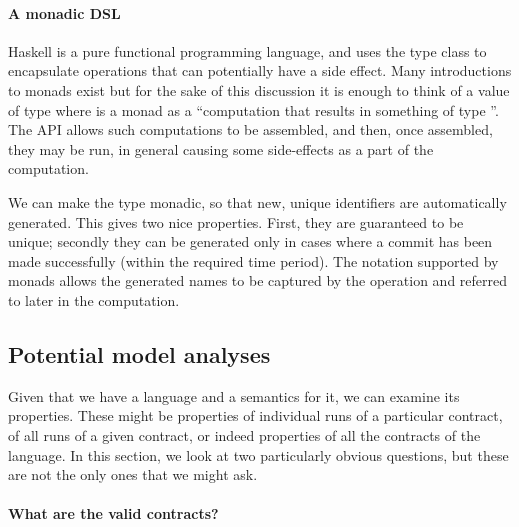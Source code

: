 \documentclass[runningheads]{llncs}
\begin{document}
\paragraph{A monadic DSL}

Haskell is a pure functional programming language, and uses the  type class to encapsulate
operations that can potentially have a side effect. Many introductions to monads exist \cite{wadler1990comprehending} 
but for the sake of this discussion it is enough to think of a value of type  where  
is a monad as a ``computation that results in something of type ''. The  API 
allows such computations to be assembled, and then, once assembled, they may be run, in general causing some 
side-effects as a part of the computation.

We can make the  type monadic, so that new, unique identifiers are automatically generated. 
This gives two nice properties. First, they are guaranteed to be unique; secondly they can be generated only in cases 
where a commit has been made successfully (within the required time period). The 
 notation supported by monads allows the generated names to be captured by the  
operation and referred to later in the computation.


\subsection{Potential model analyses}
\label{section:analysis}

Given that we have a language and a semantics for it, we can examine its properties. These might be properties of 
individual runs of a particular contract, of all runs of a given contract, or indeed properties of all the contracts of 
the language. In this section, we look at two particularly obvious questions, but these are not the only ones that we 
might ask.



\paragraph{What are the valid contracts?}
\end{document}
